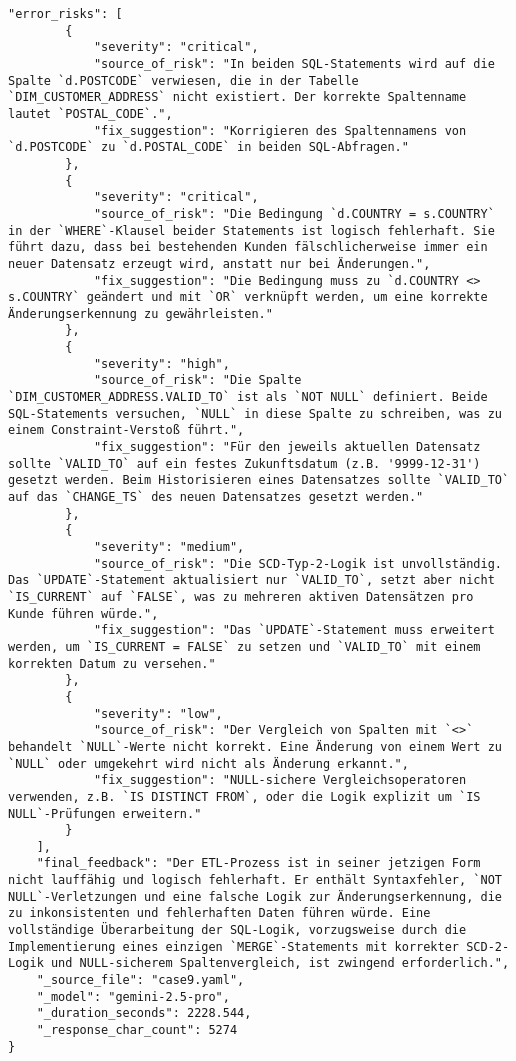 \begin{lstlisting}[caption={Ausgabe: Gemini 2.5 Pro Anwendungsfall 9 Konsistenzdurchlauf},label={gemini_case9_prompt2}]
    "error_risks": [
        {
            "severity": "critical",
            "source_of_risk": "In beiden SQL-Statements wird auf die Spalte `d.POSTCODE` verwiesen, die in der Tabelle `DIM_CUSTOMER_ADDRESS` nicht existiert. Der korrekte Spaltenname lautet `POSTAL_CODE`.",
            "fix_suggestion": "Korrigieren des Spaltennamens von `d.POSTCODE` zu `d.POSTAL_CODE` in beiden SQL-Abfragen."
        },
        {
            "severity": "critical",
            "source_of_risk": "Die Bedingung `d.COUNTRY = s.COUNTRY` in der `WHERE`-Klausel beider Statements ist logisch fehlerhaft. Sie führt dazu, dass bei bestehenden Kunden fälschlicherweise immer ein neuer Datensatz erzeugt wird, anstatt nur bei Änderungen.",
            "fix_suggestion": "Die Bedingung muss zu `d.COUNTRY <> s.COUNTRY` geändert und mit `OR` verknüpft werden, um eine korrekte Änderungserkennung zu gewährleisten."
        },
        {
            "severity": "high",
            "source_of_risk": "Die Spalte `DIM_CUSTOMER_ADDRESS.VALID_TO` ist als `NOT NULL` definiert. Beide SQL-Statements versuchen, `NULL` in diese Spalte zu schreiben, was zu einem Constraint-Verstoß führt.",
            "fix_suggestion": "Für den jeweils aktuellen Datensatz sollte `VALID_TO` auf ein festes Zukunftsdatum (z.B. '9999-12-31') gesetzt werden. Beim Historisieren eines Datensatzes sollte `VALID_TO` auf das `CHANGE_TS` des neuen Datensatzes gesetzt werden."
        },
        {
            "severity": "medium",
            "source_of_risk": "Die SCD-Typ-2-Logik ist unvollständig. Das `UPDATE`-Statement aktualisiert nur `VALID_TO`, setzt aber nicht `IS_CURRENT` auf `FALSE`, was zu mehreren aktiven Datensätzen pro Kunde führen würde.",
            "fix_suggestion": "Das `UPDATE`-Statement muss erweitert werden, um `IS_CURRENT = FALSE` zu setzen und `VALID_TO` mit einem korrekten Datum zu versehen."
        },
        {
            "severity": "low",
            "source_of_risk": "Der Vergleich von Spalten mit `<>` behandelt `NULL`-Werte nicht korrekt. Eine Änderung von einem Wert zu `NULL` oder umgekehrt wird nicht als Änderung erkannt.",
            "fix_suggestion": "NULL-sichere Vergleichsoperatoren verwenden, z.B. `IS DISTINCT FROM`, oder die Logik explizit um `IS NULL`-Prüfungen erweitern."
        }
    ],
    "final_feedback": "Der ETL-Prozess ist in seiner jetzigen Form nicht lauffähig und logisch fehlerhaft. Er enthält Syntaxfehler, `NOT NULL`-Verletzungen und eine falsche Logik zur Änderungserkennung, die zu inkonsistenten und fehlerhaften Daten führen würde. Eine vollständige Überarbeitung der SQL-Logik, vorzugsweise durch die Implementierung eines einzigen `MERGE`-Statements mit korrekter SCD-2-Logik und NULL-sicherem Spaltenvergleich, ist zwingend erforderlich.",
    "_source_file": "case9.yaml",
    "_model": "gemini-2.5-pro",
    "_duration_seconds": 2228.544,
    "_response_char_count": 5274
}
\end{lstlisting}

